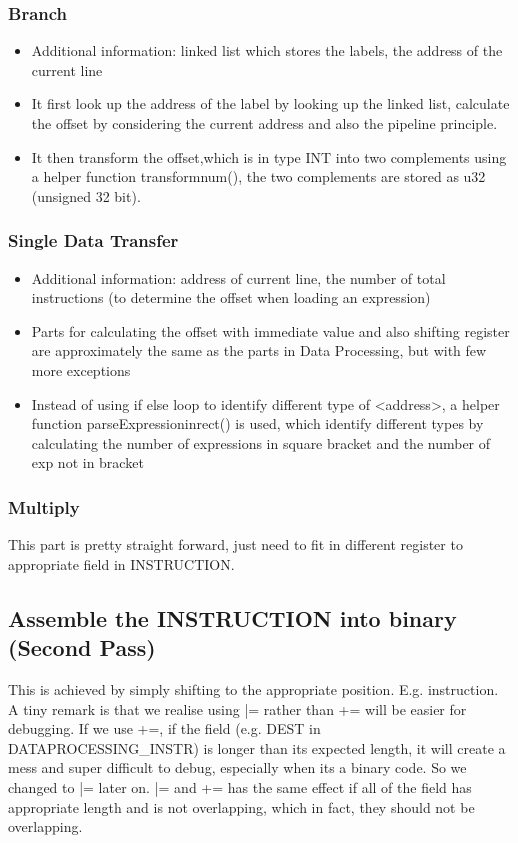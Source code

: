\documentclass[11pt]{article}
\begin{document}
\subsubsection{Branch}
\begin{itemize}  
\item Additional information: linked list which stores the labels, the address of the current line

\item It first look up the address of the label by looking up the linked list, calculate the offset by considering the current address and also the pipeline principle.

\item It then transform the offset,which is in type INT into two complements using a helper function transformnum(), the two complements are stored as u32 (unsigned 32 bit).
\end{itemize}




\subsubsection{Single Data Transfer}
\begin{itemize}  
\item Additional information: address of current line, the number of total instructions (to determine the offset when loading an expression)

\item Parts for calculating the offset with immediate value and also shifting register are approximately the same as the parts in Data Processing, but with few more exceptions

\item Instead of using if else loop to identify different type of <address>, a helper function parseExpressioninrect() is used, which identify different types by calculating the number of expressions in square bracket and the number of exp not in bracket
\end{itemize}

\subsubsection{Multiply}
This part is pretty straight forward, just need to fit in different register to appropriate field in INSTRUCTION.

\subsection{Assemble the INSTRUCTION into binary (Second Pass)}
This is achieved by simply shifting to the appropriate position. E.g. instruction. A tiny remark is that we realise using |= rather than += will be easier for debugging. If we use +=, if the field (e.g. DEST in DATAPROCESSING{\_}INSTR) is longer than its expected length, it will create a mess and super difficult to debug, especially when its a binary code. So we changed to |= later on. |= and += has the same effect if all of the field has appropriate length and is not overlapping, which in fact, they should not be overlapping.
\end{document}
